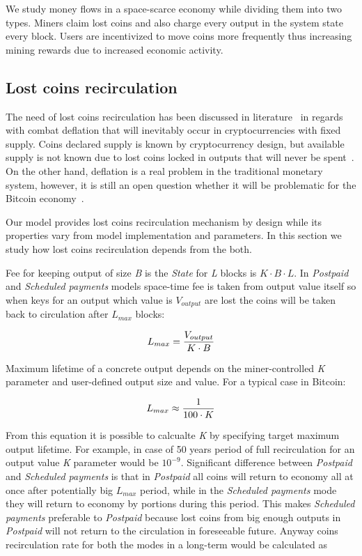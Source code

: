\documentclass[]{llncs}   %
\newcommand{\state}{\textit{State}}
\begin{document}
We study money flows in a space-scarce economy while dividing them into two types. Miners claim lost coins and also charge every output in the system state every block. Users are incentivized to move coins more frequently thus increasing mining rewards due to increased economic activity.  

\subsection{Lost coins recirculation}
\label{sec:re}

The need of lost coins recirculation has been discussed in literature~\cite{gjermundrod2014recirculating, gjermundrod2016going} in regards with combat deflation that will inevitably occur in cryptocurrencies with fixed supply. Coins declared supply is known by cryptocurrency design, but available supply is not known due to lost coins locked in outputs that will never be spent~\cite{ron2013quantitative}. On the other hand, deflation is a real problem in the traditional monetary system, however, it is still an open question whether it will be problematic for the Bitcoin economy~\cite{bitcoinDeflationarySpiral, barber2012bitter}.


Our model provides lost coins recirculation mechanism by design while its properties vary from model implementation and parameters. In this section we study how lost coins recirculation depends from the both.

Fee for keeping output of size \textit{B} is the \state{} for \textit{L} blocks is ${K \cdot B \cdot L}$. In \textit{Postpaid} and \textit{Scheduled payments} models space-time fee is taken from output value itself so when keys for an output which value is \textit{$V_{output}$} are lost the coins will be taken back to circulation after \textit{$L_{max}$} blocks: 

\begin{equation}
{L_{max} = {V_{output} \over K \cdot B}}
\end{equation}

Maximum lifetime of a concrete output depends on the miner-controlled \textit{K} parameter and user-defined output size and value. For a typical case in Bitcoin:

\begin{equation}
{L_{max} \approx {1 \over 100 \cdot K}}
\end{equation}

From this equation it is possible to calcualte \textit{K} by specifying target maximum output lifetime. For example, in case of 50 years period of full recirculation for an output value \textit{K} parameter would be $10^{-9}$. Significant difference between \textit{Postpaid} and \textit{Scheduled payments} is that in \textit{Postpaid} all coins will return to economy all at once after potentially big $L_{max}$ period, while in the \textit{Scheduled payments} mode they will return to economy by portions during this period. This makes \textit{Scheduled payments} preferable to \textit{Postpaid} because lost coins from big enough outputs in \textit{Postpaid} will not return to the circulation in foreseeable future. Anyway coins recirculation rate for both the modes in a long-term would be calculated as
\end{document}
